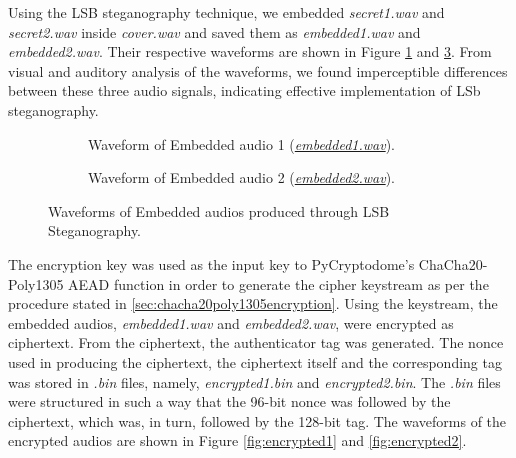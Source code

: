 \documentclass[a4paper]{cas-sc}
\begin{document}
Using the LSB steganography technique, we embedded \textit{secret1.wav} and \textit{secret2.wav} inside \textit{cover.wav} and saved them as \textit{embedded1.wav} and \textit{embedded2.wav}. Their respective waveforms are shown in Figure \ref{fig:embeddedAudio1} and \ref{fig:embeddedAudio2}. From visual and auditory analysis of the waveforms, we found imperceptible differences between these three audio signals, indicating effective implementation of LSb steganography.
\begin{figure}[pos=h]
    \begin{subfigure}[!h]{0.45\textwidth}
        \begin{center}
            \centering
            
            \caption{Waveform of Embedded audio 1 (\href{https://drive.google.com/file/d/1QLpjPCV-qFr1sKiN3rxpOOmUICOiu5hA/view?usp=drive_link}{\textit{embedded1.wav}}).}
            \label{fig:embeddedAudio1}
        \end{center}
    \end{subfigure}
    \hfill
    \begin{subfigure}[!h]{0.45\textwidth}
        \begin{center}
            
            \caption{Waveform of Embedded audio 2 (\href{https://drive.google.com/file/d/1weMUGkD9NFAO6HAVIQ7LOt6ksLJKHcn6/view?usp=drive_link}{\textit{embedded2.wav}}).}
            \label{fig:embeddedAudio2}
        \end{center}
    \end{subfigure}
    \caption{Waveforms of Embedded audios produced through LSB Steganography.}
\end{figure}

The encryption key was used as the input key to PyCryptodome's ChaCha20-Poly1305 AEAD function in order to generate the cipher keystream as per the procedure stated in \ref{sec:chacha20poly1305encryption}. Using the keystream, the embedded audios, \textit{embedded1.wav} and \textit{embedded2.wav}, were encrypted as ciphertext. From the ciphertext, the authenticator tag was generated. The nonce used in producing the ciphertext, the ciphertext itself and the corresponding tag was stored in \textit{.bin} files, namely, \textit{encrypted1.bin} and \textit{encrypted2.bin}. The \textit{.bin} files were structured in such a way that the 96-bit nonce was followed by the ciphertext, which was, in turn, followed by the 128-bit tag. The waveforms of the encrypted audios are shown in Figure \ref{fig:encrypted1} and \ref{fig:encrypted2}.
\end{document}
